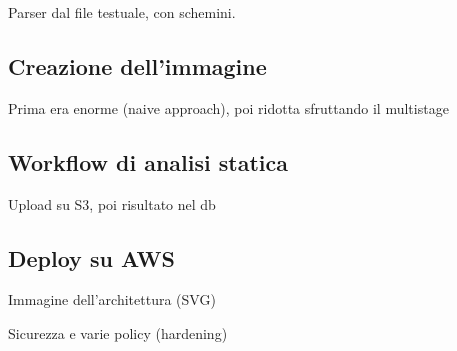Parser dal file testuale, con schemini.


\subsection{Creazione dell'immagine}
Prima era enorme (naive approach), poi ridotta sfruttando il multistage

\subsection{Workflow di analisi statica}
Upload su S3, poi risultato nel db

\subsection{Deploy su AWS}
Immagine dell'architettura (SVG)

Sicurezza e varie policy (hardening)